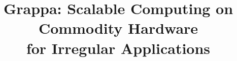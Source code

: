 



\title{Grappa: Scalable Computing on Commodity Hardware \\for Irregular Applications}

\maketitle
\begin{abstract}

\end{abstract}



















%






